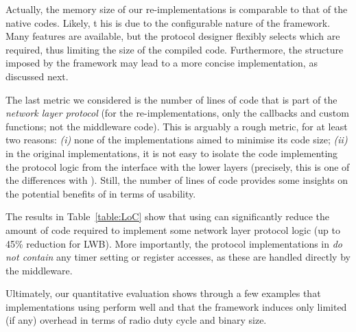 Actually, the memory size of our re-implementations is comparable to that of the native codes. Likely, t	his is due to the configurable nature of the framework. Many features are available, but the protocol designer flexibly selects which are required, thus limiting the size of the compiled code.
Furthermore, the structure imposed by the framework may lead to a more concise implementation, as discussed next.

The last metric we considered is the number of lines of code that is part of the \emph{network layer protocol} (\ie for the \baloo re-implementations, only the callbacks and custom functions; not the middleware code).
This is arguably a rough metric, for at least two reasons: \emph{(i)} none of the implementations aimed to minimise its code size; \emph{(ii)} in the original implementations, it is not easy to isolate the code implementing the protocol logic from the interface with the lower layers (precisely, this is one of the differences with \baloo).
Still, the number of lines of code provides some insights on the potential benefits of \baloo in terms of usability.

The results in Table~\ref{table:LoC} show that using \baloo can significantly reduce the amount of code required to implement some network layer protocol logic (up to 45\% reduction for LWB).
More importantly, the protocol implementations in \baloo \textsl{do not contain} any timer setting or register accesses, as these are handled directly by the middleware.

Ultimately, our quantitative evaluation shows through a few examples that implementations using \baloo perform well and that the framework induces only limited (if any) overhead in terms of radio duty cycle and binary size.
